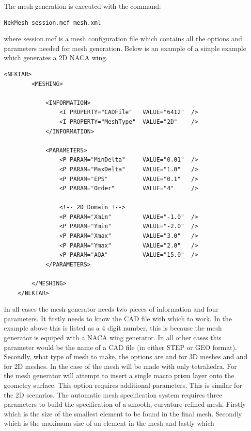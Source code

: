 The mesh generation is executed with the command:
\begin{lstlisting}[style=BashInputStyle]
    NekMesh session.mcf mesh.xml
\end{lstlisting}
where session.mcf is a mesh configuration file which contains all the options
and parameters needed for mesh generation. Below is an example of a simple
example which generates a 2D NACA wing.
\begin{lstlisting}[style=XmlStyle]
    <NEKTAR>
        <MESHING>

            <INFORMATION>
                <I PROPERTY="CADFile"   VALUE="6412"  />
                <I PROPERTY="MeshType"  VALUE="2D"    />
            </INFORMATION>

            <PARAMETERS>
                <P PARAM="MinDelta"     VALUE="0.01"  />
                <P PARAM="MaxDelta"     VALUE="1.0"   />
                <P PARAM="EPS"          VALUE="0.1"   />
                <P PARAM="Order"        VALUE="4"     />

                <!-- 2D Domain !-->
                <P PARAM="Xmin"         VALUE="-1.0"  />
                <P PARAM="Ymin"         VALUE="-2.0"  />
                <P PARAM="Xmax"         VALUE="3.0"   />
                <P PARAM="Ymax"         VALUE="2.0"   />
                <P PARAM="AOA"          VALUE="15.0"  />
            </PARAMETERS>

        </MESHING>
    </NEKTAR>
\end{lstlisting}
In all cases the mesh generator needs two pieces of information and four
parameters. It firstly needs to know the CAD file with which to work. In the
example above this is listed as a 4 digit number, this is because the mesh
generator is equiped with a NACA wing generator. In all other cases this
parameter would be the name of a CAD file (in either STEP or GEO format).
Secondly, what type of mesh to make, the options
are  and  for 3D meshes and  and 
for 2D meshes. In the case of  the mesh will be made with only
tetrahedra. For  the mesh generator will attempt to insert a single
macro prism layer onto the geometry surface. This option requires additional
parameters. This is similar for the 2D scenarios. The automatic mesh
specification system requires three parameters to build the specification of a
smooth, curvature refined mesh. Firstly  which is the size of
the smallest element to be found in the final mesh. Secondly 
which is the maximum size of an element in the mesh and lastly  which
